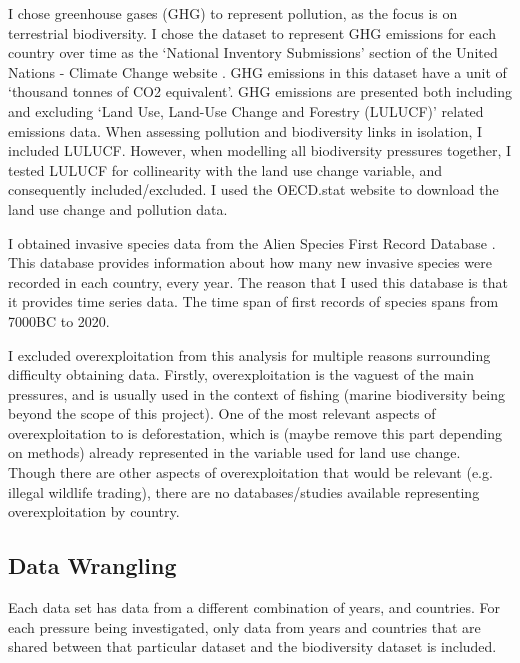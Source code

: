 \documentclass[11pt, a4paper, titlepage]{article}
\begin{document}
	I chose greenhouse gases (GHG) to represent pollution, as the focus is on terrestrial biodiversity. I chose the dataset to represent GHG emissions for each country over time as the `National Inventory Submissions' section of the United Nations - Climate Change website \citep{UN2022}. GHG emissions in this dataset have a unit of `thousand tonnes of CO2 equivalent'. GHG emissions are presented both including and excluding `Land Use, Land-Use Change and Forestry (LULUCF)' related emissions data. When assessing pollution and biodiversity links in isolation, I included LULUCF. However, when modelling all biodiversity pressures together, I tested LULUCF for collinearity with the land use change variable, and consequently included/excluded. I used the OECD.stat website to download the land use change and pollution data. 
	
	I obtained invasive species data from the Alien Species First Record Database \citep{seebens2017no, seebens2018global}. This database provides information about how many new invasive species were recorded in each country, every year. The reason that I used this database is that it provides time series data. The time span of first records of species spans from 7000BC to 2020.  
	
	I excluded overexploitation from this analysis for multiple reasons surrounding difficulty obtaining data. Firstly, overexploitation is the vaguest of the main pressures, and is usually used in the context of fishing (marine biodiversity being beyond the scope of this project). One of the most relevant aspects of overexploitation to is deforestation, which is (maybe remove this part depending on methods) already represented in the variable used for land use change. Though there are other aspects of overexploitation that would be relevant (e.g. illegal wildlife trading), there are no databases/studies available representing overexploitation by country.

	\subsection*{Data Wrangling}
	
	Each data set has data from a different combination of years, and countries. For each pressure being investigated, only data from years and countries that are shared between that particular dataset and the biodiversity dataset is included. 
	
\end{document}
